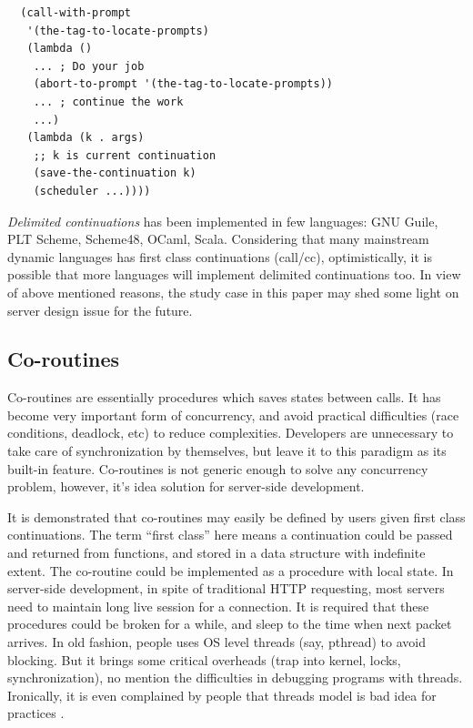 \documentclass[numbers,numberedpars]{sigplanconf}
\begin{document}
\begin{lstlisting}
  (call-with-prompt
   '(the-tag-to-locate-prompts)
   (lambda ()
    ... ; Do your job
    (abort-to-prompt '(the-tag-to-locate-prompts))
    ... ; continue the work
    ...)
   (lambda (k . args)
    ;; k is current continuation
    (save-the-continuation k)
    (scheduler ...))))
\end{lstlisting}

{\it Delimited continuations} has been implemented in few languages: GNU Guile, PLT Scheme, Scheme48, OCaml, Scala.
Considering that many mainstream dynamic languages has first class continuations (call/cc), optimistically, it is possible that more languages
will implement delimited continuations too. In view of above mentioned reasons, the study case in this paper may shed some light on server
design issue for the future.

\subsection{Co-routines} \label{Co-routines}

Co-routines are essentially procedures which saves states between calls. It has become very important form of concurrency, and avoid practical
difficulties (race conditions, deadlock, etc) to reduce complexities. Developers are unnecessary to take care of synchronization by
themselves, but leave it to this paradigm as its built-in feature. Co-routines is not generic enough to solve any concurrency problem, however,
it's idea solution for server-side development.

It is demonstrated that co-routines may easily be defined by users given first class continuations\citep{Haynes:1984:CC:800055.802046}. The
term ``first class'' here means a continuation could be passed and returned from functions, and stored in a data structure with indefinite
extent. The co-routine could be implemented as a procedure with local state. In server-side development, in spite of traditional HTTP requesting,
most servers need to maintain long live session for a connection. It is required that these procedures could be broken for a while, and sleep
to the time when next packet arrives. In old fashion, people uses OS level threads (say, pthread) to avoid blocking. But it brings some
critical overheads (trap into kernel, locks, synchronization), no mention the difficulties in debugging programs with threads. Ironically,
it is even complained by people that threads model is bad idea for practices \citep{ousterhout1996threads}.
\end{document}
